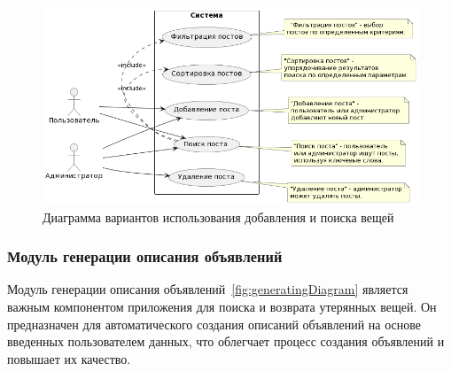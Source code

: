 \begin{figure}[htb]
	\centering
	\includegraphics[width=.7\textwidth]{images/seach-diagram-2.png}
	\parskip=6pt
	\caption{Диаграмма вариантов использования добавления и поиска вещей}
	\label{fig:searchDiagram2}
\end{figure}

\subsubsection{Модуль генерации описания объявлений}

Модуль генерации описания объявлений~\ref{fig:generatingDiagram} является важным компонентом приложения для поиска и возврата утерянных вещей. Он предназначен для автоматического создания описаний объявлений на основе введенных пользователем данных, что облегчает процесс создания объявлений и повышает их качество.

